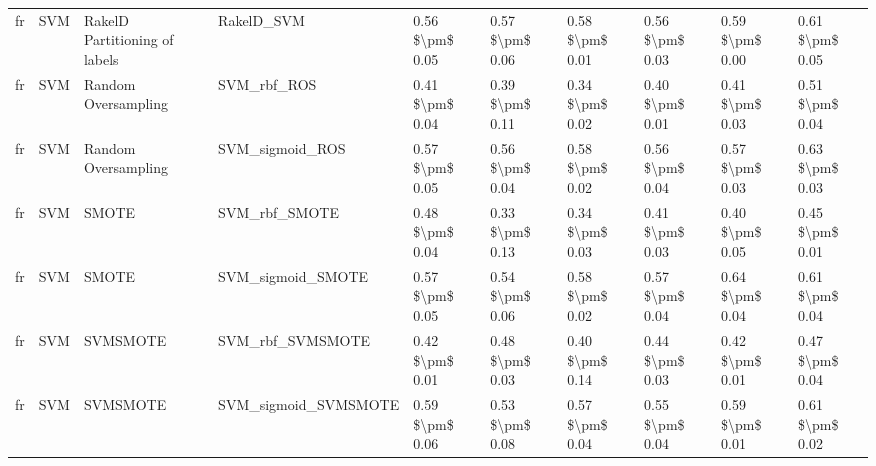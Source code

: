 \begin{tabular}{llllllllll}
      fr &                             SVM & RakelD Partitioning of labels &                                   RakelD\_SVM &     0.56 \$\textbackslash pm\$ 0.05 &           0.57 \$\textbackslash pm\$ 0.06 &       0.58 \$\textbackslash pm\$ 0.01 &        0.56 \$\textbackslash pm\$ 0.03 &                         0.59 \$\textbackslash pm\$ 0.00 & 0.61 \$\textbackslash pm\$ 0.05 \\
      fr &                             SVM &           Random Oversampling &                                  SVM\_rbf\_ROS &     0.41 \$\textbackslash pm\$ 0.04 &           0.39 \$\textbackslash pm\$ 0.11 &       0.34 \$\textbackslash pm\$ 0.02 &        0.40 \$\textbackslash pm\$ 0.01 &                         0.41 \$\textbackslash pm\$ 0.03 & 0.51 \$\textbackslash pm\$ 0.04 \\
      fr &                             SVM &           Random Oversampling &                              SVM\_sigmoid\_ROS &     0.57 \$\textbackslash pm\$ 0.05 &           0.56 \$\textbackslash pm\$ 0.04 &       0.58 \$\textbackslash pm\$ 0.02 &        0.56 \$\textbackslash pm\$ 0.04 &                         0.57 \$\textbackslash pm\$ 0.03 & 0.63 \$\textbackslash pm\$ 0.03 \\
      fr &                             SVM &                         SMOTE &                                SVM\_rbf\_SMOTE &     0.48 \$\textbackslash pm\$ 0.04 &           0.33 \$\textbackslash pm\$ 0.13 &       0.34 \$\textbackslash pm\$ 0.03 &        0.41 \$\textbackslash pm\$ 0.03 &                         0.40 \$\textbackslash pm\$ 0.05 & 0.45 \$\textbackslash pm\$ 0.01 \\
      fr &                             SVM &                         SMOTE &                            SVM\_sigmoid\_SMOTE &     0.57 \$\textbackslash pm\$ 0.05 &           0.54 \$\textbackslash pm\$ 0.06 &       0.58 \$\textbackslash pm\$ 0.02 &        0.57 \$\textbackslash pm\$ 0.04 &                         0.64 \$\textbackslash pm\$ 0.04 & 0.61 \$\textbackslash pm\$ 0.04 \\
      fr &                             SVM &                      SVMSMOTE &                             SVM\_rbf\_SVMSMOTE &     0.42 \$\textbackslash pm\$ 0.01 &           0.48 \$\textbackslash pm\$ 0.03 &       0.40 \$\textbackslash pm\$ 0.14 &        0.44 \$\textbackslash pm\$ 0.03 &                         0.42 \$\textbackslash pm\$ 0.01 & 0.47 \$\textbackslash pm\$ 0.04 \\
      fr &                             SVM &                      SVMSMOTE &                         SVM\_sigmoid\_SVMSMOTE &     0.59 \$\textbackslash pm\$ 0.06 &           0.53 \$\textbackslash pm\$ 0.08 &       0.57 \$\textbackslash pm\$ 0.04 &        0.55 \$\textbackslash pm\$ 0.04 &                         0.59 \$\textbackslash pm\$ 0.01 & 0.61 \$\textbackslash pm\$ 0.02 \\

\end{tabular}

